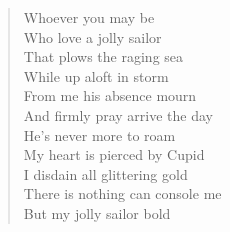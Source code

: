 \documentclass[11pt]{article}
\begin{document}
\begin{verse}
Whoever you may be\\
Who love a jolly sailor\\
That plows the raging sea\\
\vspace*{1em}
While up aloft in storm\\
From me his absence mourn\\
And firmly pray arrive the day\\
He's never more to roam\\
\vspace*{1em}
My heart is pierced by Cupid\\
I disdain all glittering gold\\
There is nothing can console me\\
But my jolly sailor bold\\
\end{verse}
\clearpage
\end{document}
